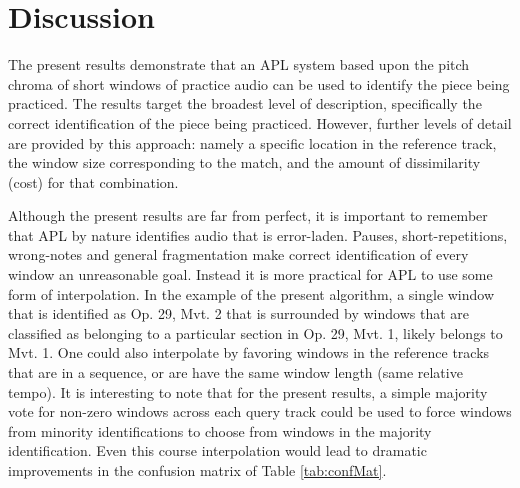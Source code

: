 \documentclass{article}
\begin{document}
\section{Discussion}
\label{sec:Discussion}

The present results demonstrate that an APL system based upon the pitch chroma of short windows of practice audio can be used to identify the piece being practiced. The results target the broadest level of description, specifically the correct identification of the piece being practiced. However, further levels of detail are provided by this approach: namely a specific location in the reference track, the window size corresponding to the match, and the amount of dissimilarity (cost) for that combination. 

Although the present results are far from perfect, it is important to remember that APL by nature identifies audio that is error-laden. Pauses, short-repetitions, wrong-notes and general fragmentation make correct identification of every window an unreasonable goal. Instead it is more practical for APL to use some form of interpolation. In the example of the present algorithm, a single window that is identified as Op. 29, Mvt. 2 that is surrounded by windows that are classified as belonging to a particular section in Op. 29, Mvt. 1, likely belongs to Mvt. 1. One could also interpolate by favoring windows in the reference tracks that are in a sequence, or are have the same window length (same relative tempo). It is interesting to note that for the present results, a simple majority vote for non-zero windows across each query track could be used to force windows from minority identifications to choose from windows in the majority identification. Even this course interpolation would lead to dramatic improvements in the confusion matrix of Table \ref{tab:confMat}. 

\end{document}

